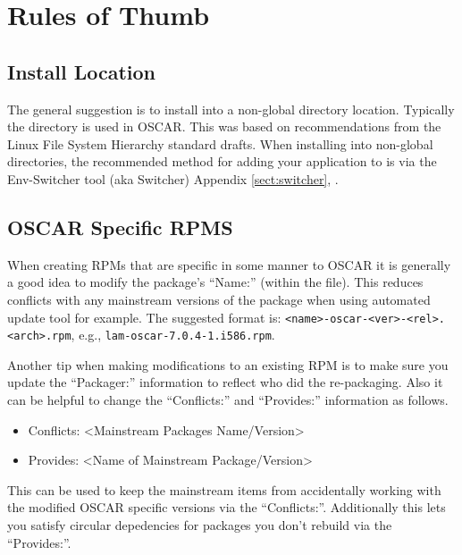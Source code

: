 
\section{Rules of Thumb}
\label{sect:rules-of-thumb}


\subsection{Install Location}

The general suggestion is to install into a non-global directory location.
Typically the  directory is used in OSCAR.  This was based
on recommendations from the Linux File System Hierarchy standard drafts. 
When installing into non-global directories, the recommended method for
adding your application to  is via the Env-Switcher tool (aka
Switcher) Appendix \ref{sect:switcher}, \pageref{sect:switcher}.



\subsection{OSCAR Specific RPMS}

When creating RPMs that are specific in some manner to OSCAR it is
generally a good idea to modify the package's ``Name:'' (within the
 file).  This reduces conflicts with any mainstream versions of
the package when using automated update tool for example.  The suggested
format is: \verb=<name>-oscar-<ver>-<rel>.<arch>.rpm=,  e.g.,
\verb=lam-oscar-7.0.4-1.i586.rpm=.

Another tip when making modifications to an existing RPM is to make sure
you update the ``Packager:'' information to reflect who did the
re-packaging.  Also it can be helpful to change the ``Conflicts:'' and
``Provides:'' information as follows.
\begin{itemize}

	\item Conflicts: <Mainstream Packages Name/Version>

	\item Provides: <Name of Mainstream Package/Version>

\end{itemize}
This can be used to keep the mainstream items from accidentally working
with the modified OSCAR specific versions via the ``Conflicts:''.
Additionally this lets you satisfy circular depedencies for packages you
don't rebuild via the ``Provides:''.





